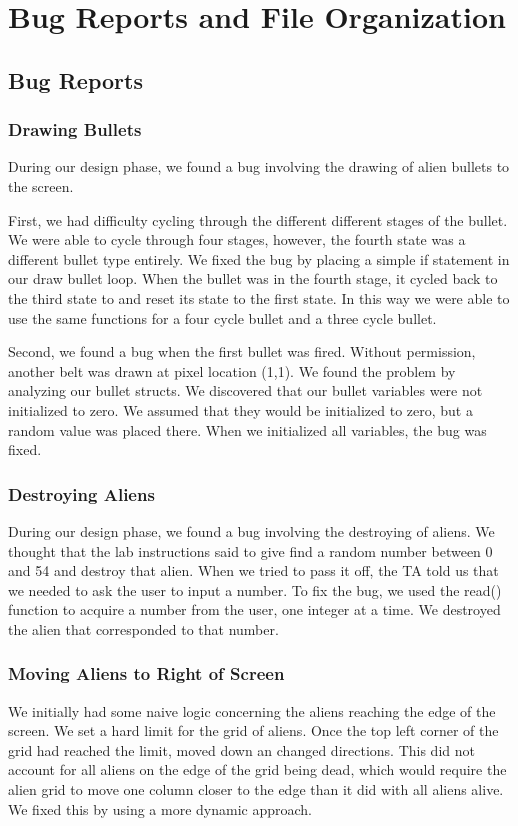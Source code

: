 \documentclass[11pt,letter,oneside]{report}
\begin{document}
\chapter{Bug Reports and File Organization}

\section{Bug Reports}

\subsection{Drawing Bullets}
During our design phase, we found a bug involving the drawing of alien bullets to the screen. 

First, we had difficulty cycling through the different different stages of the bullet. We were able to cycle through four stages, however, the fourth state was a different bullet type entirely. We fixed the bug by placing a simple if statement in our draw bullet loop. When the bullet was in the fourth stage, it cycled back to the third state to and reset its state to the first state. In this way we were able to use the same functions for a four cycle bullet and a three cycle bullet.

Second, we found a bug when the first bullet was fired. Without permission, another belt was drawn at pixel location (1,1). We found the problem by analyzing our bullet structs. We discovered that our bullet variables were not initialized to zero. We assumed that they would be initialized to zero, but a random value was placed there. When we initialized all variables, the bug was fixed.

\subsection{Destroying Aliens}
During our design phase, we found a bug involving the destroying of aliens. We thought that the lab instructions said to give find a random number between 0 and 54 and destroy that alien. When we tried to pass it off, the TA told us that we needed to ask the user to input a number. To fix the bug, we used the read() function to acquire a number from the user, one integer at a time. We destroyed the alien that corresponded to that number.

\subsection{Moving Aliens to Right of Screen}
We initially had some naive logic concerning the aliens reaching the edge of the screen.  We set a hard limit for the grid of aliens.  Once the top left corner of the grid had reached the limit, moved down an changed directions.  This did not account for all aliens on the edge of the grid being dead, which would require the alien grid to move one column closer to the edge than it did with all aliens alive.  We fixed this by using a more dynamic approach.
\end{document}
